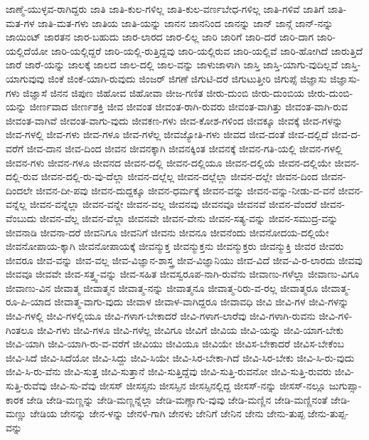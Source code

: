 {ಜಾಣ್ಮೆ-ಯುಳ್ಳವ-ರಾಗಿದ್ದರು
ಜಾತಿ
ಜಾತಿ-ಕುಲ-ಗಳಿಲ್ಲ
ಜಾತಿ-ಕುಲ-ವರ್ಣಬೇಧ-ಗಳಿಲ್ಲ
ಜಾತಿ-ಗಳಿವೆ
ಜಾತಿಗೆ
ಜಾತಿ-ಮತ-ಗಳ
ಜಾತಿ-ಮತ-ಗಳು
ಜಾತಿಯ
ಜಾತಿ-ಯನ್ನು
ಜಾನನ
ಜಾನನಿಂದ
ಜಾನನ್ನು
ಜಾನ್
ಜಾನ್ಗೆ
ಜಾನ್-ನನ್ನು
ಜಾಯಿಂಟ್
ಜಾರತನ
ಜಾರ-ಬಹುದು
ಜಾರ-ಲಾರದ
ಜಾರ-ಲಿಲ್ಲ
ಜಾರಿ
ಜಾರಿಗೆ
ಜಾರಿ-ದರೆ
ಜಾರಿ-ದಾಗ
ಜಾರಿ-ಯಲ್ಲಿದೆಯೋ
ಜಾರಿ-ಯಲ್ಲಿದ್ದರೆ
ಜಾರಿ-ಯಲ್ಲಿ-ರುತ್ತಿದ್ದವು
ಜಾರಿ-ಯಲ್ಲಿರುವ
ಜಾರಿ-ಯಲ್ಲಿವೆ
ಜಾರಿ-ಹೋಗಿದೆ
ಜಾರುತ್ತಿದೆ
ಜಾರೆ
ಜಾರೆ-ಯನ್ನು
ಜಾಲಕ್ಕೆ
ಜಾಲದ
ಜಾಲ-ದಲ್ಲಿ
ಜಾಲ-ವನ್ನು
ಜಾಳುಜಾಳಾಗಿ
ಜಾಸ್ತಿ
ಜಾಸ್ತಿ-ಯಾಗು-ವುದಿಲ್ಲವೆ
ಜಾಸ್ತಿ-ಯಾಗುವುವು
ಜಿಂಕೆ
ಜಿಂಕೆ-ಯಾಗಿ-ರುವುದು
ಜಿಂಜರ್
ಜಿಗಣೆ
ಜಿಗುಟಿ-ದರೆ
ಜಿಗುಟುತ್ತೀರಿ
ಜಿಗುಪ್ಸೆ
ಜಿಜ್ಞಾಸು
ಜಿಜ್ಞಾಸು-ಗಳು
ಜಿಜ್ಞಾಸೆ
ಜಿನನ
ಜಿಪುಣ
ಜಿಹೋವ
ಜಿಹೋವಾ
ಜೀಜ-ಗಣಿತ
ಜೀರು-ದುಂಬಿ
ಜೀರು-ದುಂಬಿಯ
ಜೀರು-ದುಂಬಿ-ಯನ್ನು
ಜೀರ್ಣವಾದ
ಜೀರ್ಣಶಕ್ತಿ
ಜೀವ
ಜೀವಂತ
ಜೀವಂತ-ರಾಗಿ-ರುವರು
ಜೀವಂತ-ವಾಗಿತ್ತು
ಜೀವಂತ-ವಾಗಿ-ರುವ
ಜೀವಂತ-ವಾಗಿವೆ
ಜೀವಂತ-ವಾಗು-ವುದು
ಜೀವಕಣ-ಗಳು
ಜೀವ-ಕೋಶ-ಗಳಿಂದ
ಜೀವಕ್ಕೂ
ಜೀವಕ್ಕೆ
ಜೀವ-ಗಳನ್ನು
ಜೀವ-ಗಳಲ್ಲಿ
ಜೀವ-ಗಳು
ಜೀವ-ಗಳೂ
ಜೀವ-ಗಳೆಲ್ಲ
ಜೀವಜ್ಯೋತಿ-ಗಳು
ಜೀವದ
ಜೀವ-ದಂತೆ
ಜೀವ-ದಲ್ಲಿದೆ
ಜೀವ-ದ-ವರೆಗೆ
ಜೀವ-ದಾನ
ಜೀವ-ದಿಂದ
ಜೀವನ
ಜೀವನಕ್ಕಾಗಿ
ಜೀವನಕ್ಕಿಂತ
ಜೀವನಕ್ಕೆ
ಜೀವನ-ಗತಿ-ಯಲ್ಲಿ
ಜೀವನ-ಗಳಲ್ಲಿ
ಜೀವನ-ಗಳು
ಜೀವನ-ಗಳೂ
ಜೀವನದ
ಜೀವನ-ದಲ್ಲಿ
ಜೀವನ-ದಲ್ಲಿಯೂ
ಜೀವನ-ದಲ್ಲಿಯೆ
ಜೀವನ-ದಲ್ಲಿಯೇ
ಜೀವನ-ದಲ್ಲಿ-ರುವ
ಜೀವನ-ದಲ್ಲಿ-ರು-ವು-ದೆಲ್ಲಾ
ಜೀವನ-ದಲ್ಲೆಲ್ಲ
ಜೀವನ-ದಲ್ಲೆಲ್ಲಾ
ಜೀವನ-ದಲ್ಲೇ
ಜೀವನ-ದಿಂದ
ಜೀವನ-ದಿಂದಲೇ
ಜೀವನ-ದೀ-ಪವು
ಜೀವನ-ದುದ್ದಕ್ಕೂ
ಜೀವನ-ಧರ್ಮಕ್ಕೆ
ಜೀವನ-ವನ್ನು
ಜೀವನ-ವನ್ನು-ನೀಡು-ವ-ವನೆ
ಜೀವನ-ವನ್ನೆಲ್ಲ
ಜೀವನ-ವನ್ನೆಲ್ಲಾ
ಜೀವನ-ವನ್ನೇ
ಜೀವನ-ವಲ್ಲ
ಜೀವನವು
ಜೀವನವೂ
ಜೀವನವೆ
ಜೀವನ-ವೆಂದರೆ
ಜೀವನ-ವೆಂಬುದು
ಜೀವನ-ವೆಲ್ಲ
ಜೀವನ-ವೆಲ್ಲಾ
ಜೀವನವೇ
ಜೀವನ-ವೇನು
ಜೀವನ-ಸತ್ಯ-ವನ್ನು
ಜೀವನ-ಸಮುದ್ರ-ವನ್ನು
ಜೀವನಾಡಿ
ಜೀವನಾ-ದರೆ
ಜೀವನಿಗೂ
ಜೀವನಿಗೆ
ಜೀವನು
ಜೀವನೂ
ಜೀವನೆಂದು
ಜೀವನೋದಯ-ದಲ್ಲಿಯೇ
ಜೀವನೋಪಾಯ-ಕ್ಕಾಗಿ
ಜೀವನೋಪಾಯಕ್ಕೆ
ಜೀವನ್ಮುಕ್ತ
ಜೀವನ್ಮುಕ್ತನು
ಜೀವನ್ಮುಕ್ತರು
ಜೀವನ್ಮುಕ್ತಿ
ಜೀವರ
ಜೀವರು
ಜೀವರೂ
ಜೀವ-ವನ್ನು
ಜೀವ-ವಲ್ಲ
ಜೀವ-ವಿಜ್ಞಾನ-ಶಾಸ್ತ್ರ
ಜೀವ-ವಿಜ್ಞಾನಿಯು
ಜೀವ-ವಿದೆ
ಜೀವ-ವಿ-ರ-ಲಾರದು
ಜೀವವು
ಜೀವವೂ
ಜೀವವೇ
ಜೀವ-ಸತ್ತ್ವ-ವನ್ನು
ಜೀವ-ಸಹಿತ
ಜೀವಸ್ವರೂಪ-ನಾಗಿ-ರುವೆನು
ಜೀವಾಣು-ಗಳೆಲ್ಲಾ
ಜೀವಾಣು-ವಿಗೂ
ಜೀವಾಣು-ವಿನ
ಜೀವಾತ್ಮ
ಜೀವಾತ್ಮನ
ಜೀವಾತ್ಮ-ನನ್ನು
ಜೀವಾತ್ಮನೂ
ಜೀವಾತ್ಮ-ರಿರು-ವ-ರಲ್ಲ
ಜೀವಾತ್ಮರೂ
ಜೀವಾತ್ಮ-ರೂ-ಪಿ-ಯಾದ
ಜೀವಾತ್ಮ-ವಾಗು-ವುದು
ಜೀವಾಳ
ಜೀವಾಳ-ವಾಗಿದ್ದರೂ
ಜೀವಾವಧಿ
ಜೀವಿ
ಜೀವಿ-ಗಳ
ಜೀವಿ-ಗಳನ್ನು
ಜೀವಿ-ಗಳಲ್ಲಿ
ಜೀವಿ-ಗಳಲ್ಲಿಯೂ
ಜೀವಿ-ಗಳಾಗ-ಬೇಕಾದರೆ
ಜೀವಿ-ಗಳಾಗ-ಲಾರೆವು
ಜೀವಿ-ಗಳಾಗಿ-ರುವನು
ಜೀವಿ-ಗಳಿ-ಗಿಂತಲೂ
ಜೀವಿ-ಗಳು
ಜೀವಿ-ಗಳೂ
ಜೀವಿ-ಗಳೆಲ್ಲ
ಜೀವಿಗೂ
ಜೀವಿಗೆ
ಜೀವಿಯ
ಜೀವಿ-ಯನ್ನು
ಜೀವಿ-ಯಾಗ-ಬೇಕು
ಜೀವಿ-ಯಾಗಿ
ಜೀವಿ-ಯಾಗಿ-ರು-ವ-ವರೆಗೆ
ಜೀವಿಯು
ಜೀವಿಯೂ
ಜೀವಿಯೇ
ಜೀವಿಸ-ಬೇಕಾದರೆ
ಜೀವಿಸ-ಬೇಕೆಂಬ
ಜೀವಿ-ಸಿದೆ
ಜೀವಿ-ಸಿದೆಯೋ
ಜೀವಿ-ಸಿದ್ದು
ಜೀವಿ-ಸಿಯೇ
ಜೀವಿ-ಸಿರ-ಬೇಕಾ-ಗಿದೆ
ಜೀವಿ-ಸಿರ-ಬೇಕು
ಜೀವಿ-ಸಿ-ರು-ವುದು
ಜೀವಿ-ಸಿ-ರು-ವೆನು
ಜೀವಿ-ಸುತ್ತ
ಜೀವಿ-ಸುತ್ತಾನೆ
ಜೀವಿ-ಸುತ್ತಿದ್ದೆವು
ಜೀವಿ-ಸುತ್ತಿ-ರುವನೋ
ಜೀವಿ-ಸುತ್ತಿ-ರುವರು
ಜೀವಿ-ಸುತ್ತಿ-ರುವೆವು
ಜೀವಿ-ಸು-ವೆವು
ಜೀಸಸ್
ಜೀಸಸ್ಸನು
ಜೀಸಸ್ಸಿನ
ಜೀಸಸ್ಸಿನಲ್ಲಿದ್ದ
ಜೀಸಸ್-ನನ್ನು
ಜೀಸಸ್-ನಲ್ಲೂ
ಜುಗುಪ್ಸಾ-ಕಾರಕ
ಜೇಡಿ
ಜೇಡಿ-ಮಣ್ಣನ್ನು
ಜೇಡಿ-ಮಣ್ಣನ್ನೆಲ್ಲಾ
ಜೇಡಿ-ಮಣ್ಣಾಗು-ವುವು
ಜೇಡಿ-ಮಣ್ಣಿನ
ಜೇಡಿ-ಮಣ್ಣಿನಂತೆ
ಜೇಡಿ-ಮಣ್ಣು
ಜೇಡಿಯ
ಜೇನನ್ನು
ಜೇನ-ಳನ್ನು
ಜೇನಳಿ-ಗಾಗಿ
ಜೇನಳು
ಜೇನಿಗೆ
ಜೇನಿನ
ಜೇನು
ಜೇನು-ತುಪ್ಪ
ಜೇನು-ತುಪ್ಪ-ವನ್ನು
}

